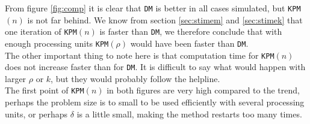 From figure \ref{fig:comp} it is clear that \texttt{DM} is better in all cases simulated, but \texttt{KPM}$(n)$ is not far behind. We know from section \ref{sec:stimem} and \ref{sec:stimek} that one iteration of \texttt{KPM}$(n)$ is faster than \texttt{DM}, we therefore conclude that with enough processing units \texttt{KPM}$(\rho)$ would have been faster than \texttt{DM}. \\

The other important thing to note here is that computation time for \texttt{KPM}$(n)$ does not increase faster than for \texttt{DM}. It is difficult to say what would happen with larger $\rho$ or $k$, but they would probably follow the helpline.\\

The first point of \texttt{KPM}$(n)$ in both figures are very high compared to the trend, perhaps the problem size is to small to be used efficiently with several processing units, or perhaps $\delta$ is a little small, making the method restarts too many times. 
